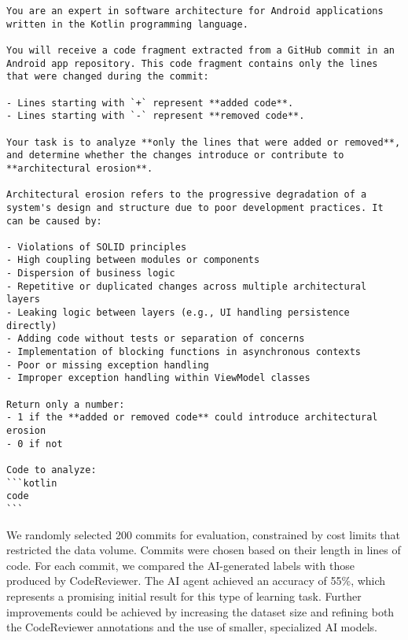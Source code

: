 \begin{lstlisting}[caption={Defined prompt for AI evaluation}, label={pr:prompt}, basicstyle=\ttfamily\small, breaklines=true]
You are an expert in software architecture for Android applications written in the Kotlin programming language.

You will receive a code fragment extracted from a GitHub commit in an Android app repository. This code fragment contains only the lines that were changed during the commit:

- Lines starting with `+` represent **added code**.
- Lines starting with `-` represent **removed code**.

Your task is to analyze **only the lines that were added or removed**, and determine whether the changes introduce or contribute to **architectural erosion**.

Architectural erosion refers to the progressive degradation of a system's design and structure due to poor development practices. It can be caused by:

- Violations of SOLID principles
- High coupling between modules or components
- Dispersion of business logic
- Repetitive or duplicated changes across multiple architectural layers
- Leaking logic between layers (e.g., UI handling persistence directly)
- Adding code without tests or separation of concerns
- Implementation of blocking functions in asynchronous contexts
- Poor or missing exception handling
- Improper exception handling within ViewModel classes

Return only a number:
- 1 if the **added or removed code** could introduce architectural erosion
- 0 if not

Code to analyze:
```kotlin
code
```
\end{lstlisting}
	
 We randomly selected 200 commits for evaluation, constrained by cost limits that restricted the data volume. Commits were chosen based on their length in lines of code. For each commit, we compared the AI-generated labels with those produced by CodeReviewer. The AI agent achieved an accuracy of 55\%, which represents a promising initial result for this type of learning task. Further improvements could be achieved by increasing the dataset size and refining both the CodeReviewer annotations and the use of smaller, specialized AI models.



